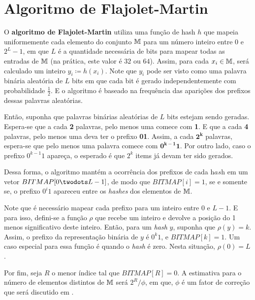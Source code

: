 \section{Algoritmo de Flajolet-Martin}
\label{sec:flajolet-martin:algorithm}

O \textbf{algoritmo de Flajolet-Martin} utiliza uma função de hash $h$ que mapeia uniformemente cada elemento do 
conjunto $\mathbb{M}$ para um número inteiro entre $0$ e $2^L-1$, em que $L$ é a quantidade necessária de bits para 
mapear todas as entradas de $\mathbb{M}$ (na prática, este valor é $32$ ou $64$). Assim, para cada $x_i \in \mathbb{M}$, 
será calculado um inteiro $y_i \coloneqq h(x_i)$. Note que $y_i$ pode ser visto como uma palavra binária aleatória de 
$L$ bits em que cada bit é gerado independentemente com probabilidade $\frac{1}{2}$. E o algoritmo é baseado na 
frequência das aparições dos prefixos dessas palavras aleatórias.

Então, suponha que palavras binárias aleatórias de $L$ bits estejam sendo geradas. Espera-se que a cada \textbf{2} 
palavras, pelo menos uma comece com \textbf{1}. E que a cada \textbf{4} palavras, pelo menos uma deva ter o prefixo 
\textbf{01}. Assim, a cada $\mathbf{2^k}$ palavras, espera-se que pelo menos uma palavra comece com $\mathbf{0^{k-1}1}$. 
Por outro lado, caso o prefixo $0^{k-1}1$ apareça, o esperado é que $2^{k}$ items já devam ter sido gerados. 

Dessa forma, o algoritmo mantém a ocorrência dos prefixos de cada $\textit{hash}$ em um vetor $BITMAP[0 \twodots L-1]$, 
de modo que $BITMAP[i] = 1$, se e somente se, o prefixo $0^i1$ apareceu entre os \textit{hashes} dos elementos de 
$\mathbb{M}$. 

Note que é necessário mapear cada prefixo para um inteiro entre $0$ e $L - 1$. E para isso, defini-se a função $\rho$ 
que recebe um inteiro e devolve a posição do 1 menos significativo deste inteiro. Então, para um \textit{hash} $y$, 
suponha que $\rho(y) = k$. Assim, o prefixo da representação binária de $y$ é $0^k1$, e $BITMAP[k] = 1$. Um caso 
especial para essa função é quando o \textit{hash} é zero. Nesta situação, $\rho(0) = L$.

Por fim, seja $R$ o menor índice tal que $BITMAP[R] = 0$. A estimativa para o número de elementos distintos de 
$\mathbb{M}$ será $2^R/\phi$, em que, $\phi$ é um fator de correção que será discutido em 
.

